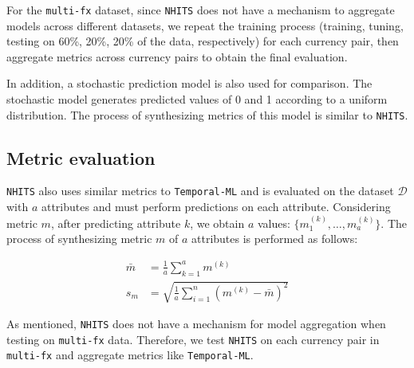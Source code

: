 For the \verb|multi-fx| dataset, since \verb|NHITS| does not have a mechanism to aggregate models across different datasets, we repeat the training process (training, tuning, testing on 60\%, 20\%, 20\% of the data, respectively) for each currency pair, then aggregate metrics across currency pairs to obtain the final evaluation.


In addition, a stochastic prediction model is also used for comparison. The stochastic model generates predicted values of 0 and 1 according to a uniform distribution. The process of synthesizing metrics of this model is similar to \verb|NHITS|.

\subsection{Metric evaluation}


\verb|NHITS| also uses similar metrics to \verb|Temporal-ML| and is evaluated on the dataset $\mathcal{D}$ with $a$ attributes and must perform predictions on each attribute. Considering metric $m$, after predicting attribute $k$, we obtain $a$ values: $\{m^{(k)}_1,\dots,m^{(k)}_a\}$. The process of synthesizing metric $m$ of $a$ attributes is performed as follows:

\begin{align*}
    \bar{m} &= \frac{1}{a}\sum_{k=1}^a{m^{(k)}}\\
    s_m &= \sqrt{\frac{1}{a} \sum_{i=1}^n{(m^{(k)} - \bar{m})^2}}
\end{align*}


As mentioned, \verb|NHITS| does not have a mechanism for model aggregation when testing on \verb|multi-fx| data. Therefore, we test \verb|NHITS| on each currency pair in \verb|multi-fx| and aggregate metrics like \verb|Temporal-ML|.

